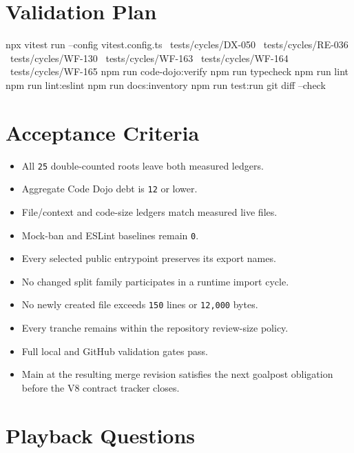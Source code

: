 \section{Validation Plan}\label{record-247-validation-plan}

\begin{CodeBlock}
npx vitest run --config vitest.config.ts \
  tests/cycles/DX-050 \
  tests/cycles/RE-036 \
  tests/cycles/WF-130 \
  tests/cycles/WF-163 \
  tests/cycles/WF-164 \
  tests/cycles/WF-165
npm run code-dojo:verify
npm run typecheck
npm run lint
npm run lint:eslint
npm run docs:inventory
npm run test:run
git diff --check
\end{CodeBlock}

\section{Acceptance Criteria}\label{record-247-acceptance-criteria}

\begin{itemize}
\tightlist
\item
  All \texttt{2\allowbreak{}5} double-counted roots leave both measured ledgers.
\item
  Aggregate Code Dojo debt is \texttt{1\allowbreak{}2} or lower.
\item
  File/context and code-size ledgers match measured live files.
\item
  Mock-ban and ESLint baselines remain \texttt{0}.
\item
  Every selected public entrypoint preserves its export names.
\item
  No changed split family participates in a runtime import cycle.
\item
  No newly created file exceeds \texttt{1\allowbreak{}5\allowbreak{}0} lines or \texttt{1\allowbreak{}2\allowbreak{},\allowbreak{}0\allowbreak{}0\allowbreak{}0} bytes.
\item
  Every tranche remains within the repository review-size policy.
\item
  Full local and GitHub validation gates pass.
\item
  Main at the resulting merge revision satisfies the next goalpost obligation before the V8 contract tracker closes.
\end{itemize}

\section{Playback Questions}\label{record-247-playback-questions}

